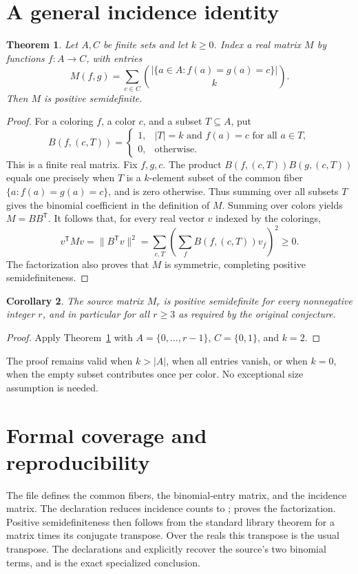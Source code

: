 \documentclass[11pt]{article}
\newtheorem{theorem}{Theorem}
\newtheorem{corollary}[theorem]{Corollary}
\begin{document}
\section{A general incidence identity}
\begin{theorem}\label{thm:gram}
Let $A,C$ be finite sets and let $k\ge0$. Index a real matrix $M$ by functions $f:A\to C$, with entries
\[
M(f,g)=\sum_{c\in C}\binom{|\{a\in A:f(a)=g(a)=c\}|}{k}.
\]
Then $M$ is positive semidefinite.
\end{theorem}
\begin{proof}
For a coloring $f$, a color $c$, and a subset $T\subseteq A$, put
\[
B(f,(c,T))=
\begin{cases}
1,& |T|=k\text{ and }f(a)=c\text{ for all }a\in T,\\
0,&\text{otherwise}.
\end{cases}
\]
This is a finite real matrix. Fix $f,g,c$. The product
$B(f,(c,T))B(g,(c,T))$ equals one precisely when $T$ is a $k$-element subset of the common fiber $\{a:f(a)=g(a)=c\}$, and is zero otherwise. Thus summing over all subsets $T$ gives the binomial coefficient in the definition of $M$. Summing over colors yields $M=BB^{\mathsf T}$. It follows that, for every real vector $v$ indexed by the colorings,
\[
v^{\mathsf T}Mv=\|B^{\mathsf T}v\|^2
 =\sum_{c,T}\left(\sum_fB(f,(c,T))v_f\right)^2\ge0.
\]
The factorization also proves that $M$ is symmetric, completing positive semidefiniteness.
\end{proof}
\begin{corollary}
The source matrix $M_r$ is positive semidefinite for every nonnegative integer $r$, and in particular for all $r\ge3$ as required by the original conjecture.
\end{corollary}
\begin{proof}
Apply Theorem~\ref{thm:gram} with $A=\{0,\ldots,r-1\}$, $C=\{0,1\}$, and $k=2$.
\end{proof}
The proof remains valid when $k>|A|$, when all entries vanish, or when $k=0$, when the empty subset contributes once per color. No exceptional size assumption is needed.
\section{Formal coverage and reproducibility}
The file  defines the common fibers, the binomial-entry matrix, and the incidence matrix. The declaration  reduces incidence counts to ;  proves the factorization. Positive semidefiniteness then follows from the standard library theorem for a matrix times its conjugate transpose. Over the reals this transpose is the usual transpose. The declarations  and  explicitly recover the source's two binomial terms, and  is the exact specialized conclusion.
\end{document}
